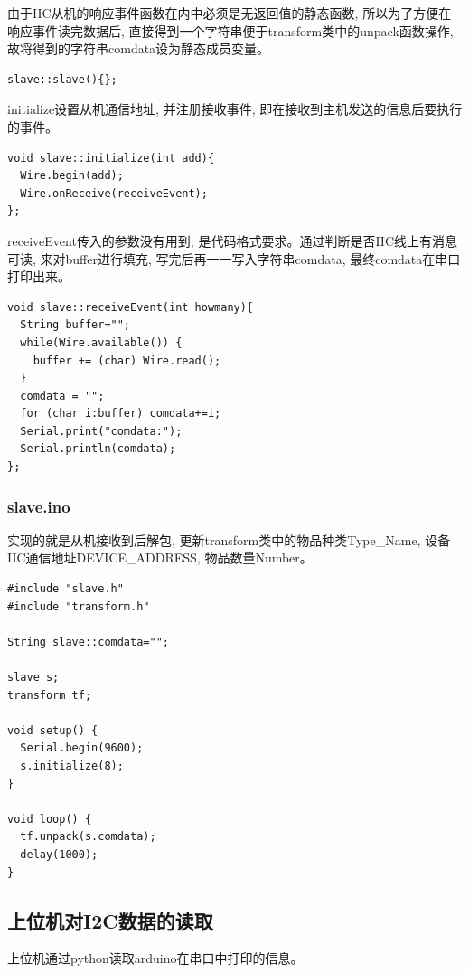 \documentclass{article}
\begin{document}
由于IIC从机的响应事件函数在内中必须是无返回值的静态函数, 所以为了方便在响应事件读完数据后, 直接得到一个字符串便于transform类中的unpack函数操作, 
故将得到的字符串comdata设为静态成员变量。

\begin{lstlisting}
slave::slave(){};  
\end{lstlisting}

initialize设置从机通信地址, 并注册接收事件, 即在接收到主机发送的信息后要执行的事件。
\begin{lstlisting}
void slave::initialize(int add){
  Wire.begin(add);
  Wire.onReceive(receiveEvent);
};  
\end{lstlisting}

receiveEvent传入的参数没有用到, 是代码格式要求。通过判断是否IIC线上有消息可读, 来对buffer进行填充, 写完后再一一写入字符串comdata, 最终comdata在串口
打印出来。
\begin{lstlisting}
void slave::receiveEvent(int howmany){
  String buffer="";
  while(Wire.available()) {
    buffer += (char) Wire.read();
  }
  comdata = "";
  for (char i:buffer) comdata+=i;
  Serial.print("comdata:");
  Serial.println(comdata);
};  
\end{lstlisting}

\subsubsection{slave.ino}
实现的就是从机接收到后解包, 更新transform类中的物品种类Type\_Name, 设备IIC通信地址DEVICE\_ADDRESS, 物品数量Number。
\begin{lstlisting}
#include "slave.h"
#include "transform.h"

String slave::comdata="";

slave s;
transform tf;

void setup() {
  Serial.begin(9600);
  s.initialize(8);
}

void loop() {
  tf.unpack(s.comdata);
  delay(1000);
}
\end{lstlisting}

\subsection{上位机对I2C数据的读取}
上位机通过python读取arduino在串口中打印的信息。

\end{document}
